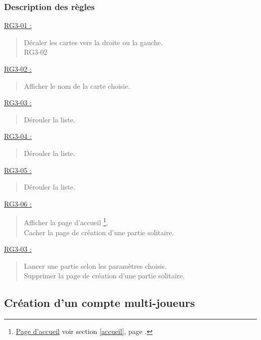 \documentclass{report}
\begin{document}
\newpage
			
		\subsubsection{Description des règles}

			\underline{RG3-01 :}
				\begin{quote}
					Décaler les cartes vers la droite ou la gauche.\\
					RG3-02\\
				\end{quote}
				
				
			\underline{RG3-02 :}
				\begin{quote}
					Afficher le nom de la carte choisie.\\
				\end{quote}


			\underline{RG3-03 :}
				\begin{quote}
					Dérouler la liste.\\
				\end{quote}


			\underline{RG3-04 :}
				\begin{quote}
					Dérouler la liste.\\				
				\end{quote}	
				

			\underline{RG3-05 :}
				\begin{quote}
					Dérouler la liste.\\				
				\end{quote}	


			\underline{RG3-06 :}
				\begin{quote}
					Afficher la page d'accueil%
						\footnote[1]{
							\hyperlink{Page d'accueil}{Page d'accueil}
							\og voir section \ref{accueil}, page \pageref{accueil}.\fg
						}.\\
					Cacher la page de création d'une partie solitaire.\\
				\end{quote}


			\underline{RG3-03 :}
				\begin{quote}
					 Lancer une partie selon les paramètres choisis.\\
					 Supprimer la page de création d'une partie solitaire.\\
				\end{quote}	


\newpage

	\subsection{Création d'un compte multi-joueurs}
	
\end{document}
